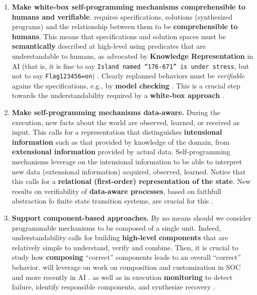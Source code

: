 \begin{enumerate}
\item \textbf{Make white-box self-programming mechanisms comprehensible to
    humans and verifiable}. 
\project requires specifications, solutions (synthesized programs)
  and the relationship between them to be
  \textbf{comprehensible to humans}.   
  This means that specifications and solution spaces must be
  \textbf{semantically} described at high-level using predicates that
  are understandable to humans, as advocated by \textbf{Knowledge
    Representation} in AI (that is, it is fine to say
  \texttt{Island named ``176-671'' is under stress}, but not to say \texttt{Flag123456=on})
  \cite{Baral10,EiterEFS10,BrewkaEP14,Shoham16,Levesque14,Levesque17}. 
Clearly replanned behaviors
  must be  \emph{verifiable} agains the specifications, e.g., by \textbf{model checking} \cite{}.
  This is a crucial step towards the understandability required by a
  \textbf{white-box approach} \cite{}.  

\item \textbf{Make self-programming mechanisms data-aware.}
  During the execution, new facts about the world are observed,
  learned, or received as input. This calls for a representation that
  distinguishes \textbf{intensional information} such as that provided
  by knowledge of the domain, from \textbf{extensional information}
  provided by actual data. Self-programming mechanisms leverage on the
  intensional information to be able to interpret new data
  (extensional information) acquired, observed, learned.  Notice that
  this calls for a \textbf{relational (first-order) representation of
    the state}.  New results on verifiability of \textbf{data-aware
    processes}, based on faithfull abstraction fo finite state
  transition systems, are
  crucial for this \cite{ClassenL08,HaririCGDM13,ClassenLLZ14,HullSV13,BelardinelliLP14,DeGLP16,CDMP17}.


\item \textbf{Support component-based approaches.}  
  By no means should we consider programmable mechanisms to be
  composed of a single unit.  Indeed, understandability calls for
  building \textbf{high-level components} that are relatively simple
  to understand, verify and combine. Then, it is crucial to study how
  \textbf{composing} ``correct'' components leads to an overall
  ``correct'' behavior. 
\project will leverage on work on composition and customization in SOC and more recently in AI
 \cite{wsf2014,SohrabiPM09,BertoliPT10,DePS13,DeGGPSS16}. %
as well as in execution \textbf{monitoring} to detect 
failure, identify responsible components, and synthesize recovery \cite{DeGMGMM14,MarrellaMS17}.



\end{enumerate}

